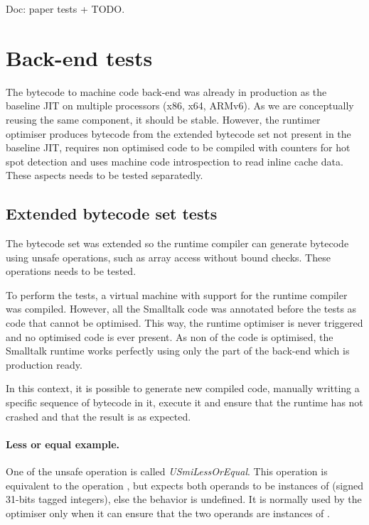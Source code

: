 \documentclass[a4paper,12pt,twoside]{../includes/ThesisStyle}
\begin{document}
Doc: paper tests + TODO.

\section{Back-end tests}

The bytecode to machine code back-end was already in production as the baseline JIT on multiple processors (x86, x64, ARMv6). As we are conceptually reusing the same component, it should be stable. However, the runtimer optimiser produces bytecode from the extended bytecode set not present in the baseline JIT, requires non optimised code to be compiled with counters for hot spot detection and uses machine code introspection to read inline cache data. These aspects needs to be tested separatedly. 

\subsection{Extended bytecode set tests}

The bytecode set was extended so the runtime compiler can generate bytecode using unsafe operations, such as array access without bound checks. These operations needs to be tested. 

To perform the tests, a virtual machine with support for the runtime compiler was compiled. However, all the Smalltalk code was annotated before the tests as code that cannot be optimised. This way, the runtime optimiser is never triggered and no optimised code is ever present. As non of the code is optimised, the Smalltalk runtime works perfectly using only the part of the back-end which is production ready.

In this context, it is possible to generate new compiled code, manually writting a specific sequence of bytecode in it, execute it and ensure that the runtime has not crashed and that the result is as expected. 

\paragraph{Less or equal example.} One of the unsafe operation is called \emph{USmiLessOrEqual}. This operation is equivalent to the operation \ct{<=}, but expects both operands to be instances of  (signed 31-bits tagged integers), else the behavior is undefined. It is normally used by the optimiser only when it can ensure that the two operands are instances of .
\end{document}
